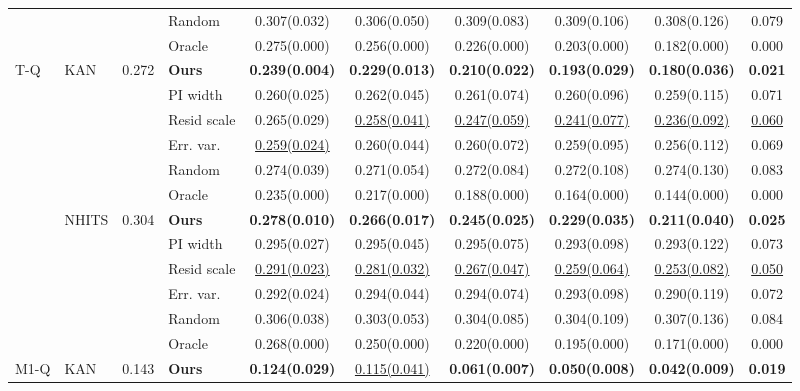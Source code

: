 \begin{table}[t]
\begin{tabular}{@{}llrlcccccc@{}}
\cmidrule(lr){4-10}
 &  &  & Random & 0.307(0.032) & 0.306(0.050) & 0.309(0.083) & 0.309(0.106) & 0.308(0.126) & 0.079 \\
 &  &  & Oracle & 0.275(0.000) & 0.256(0.000) & 0.226(0.000) & 0.203(0.000) & 0.182(0.000) & 0.000 \\
\midrule
T-Q & KAN & 0.272 & \textbf{Ours} & \textbf{0.239(0.004)} & \textbf{0.229(0.013)} & \textbf{0.210(0.022)} & \textbf{0.193(0.029)} & \textbf{0.180(0.036)} & \textbf{0.021} \\
 &  &  & PI width & 0.260(0.025) & 0.262(0.045) & 0.261(0.074) & 0.260(0.096) & 0.259(0.115) & 0.071 \\
 &  &  & Resid scale & 0.265(0.029) & \underline{0.258(0.041)} & \underline{0.247(0.059)} & \underline{0.241(0.077)} & \underline{0.236(0.092)} & \underline{0.060} \\
 &  &  & Err. var. & \underline{0.259(0.024)} & 0.260(0.044) & 0.260(0.072) & 0.259(0.095) & 0.256(0.112) & 0.069 \\
\cmidrule(lr){4-10}
 &  &  & Random & 0.274(0.039) & 0.271(0.054) & 0.272(0.084) & 0.272(0.108) & 0.274(0.130) & 0.083 \\
 &  &  & Oracle & 0.235(0.000) & 0.217(0.000) & 0.188(0.000) & 0.164(0.000) & 0.144(0.000) & 0.000 \\
\cmidrule(lr){2-10}
 & NHITS & 0.304 & \textbf{Ours} & \textbf{0.278(0.010)} & \textbf{0.266(0.017)} & \textbf{0.245(0.025)} & \textbf{0.229(0.035)} & \textbf{0.211(0.040)} & \textbf{0.025} \\
 &  &  & PI width & 0.295(0.027) & 0.295(0.045) & 0.295(0.075) & 0.293(0.098) & 0.293(0.122) & 0.073 \\
 &  &  & Resid scale & \underline{0.291(0.023)} & \underline{0.281(0.032)} & \underline{0.267(0.047)} & \underline{0.259(0.064)} & \underline{0.253(0.082)} & \underline{0.050} \\
 &  &  & Err. var. & 0.292(0.024) & 0.294(0.044) & 0.294(0.074) & 0.293(0.098) & 0.290(0.119) & 0.072 \\
\cmidrule(lr){4-10}
 &  &  & Random & 0.306(0.038) & 0.303(0.053) & 0.304(0.085) & 0.304(0.109) & 0.307(0.136) & 0.084 \\
 &  &  & Oracle & 0.268(0.000) & 0.250(0.000) & 0.220(0.000) & 0.195(0.000) & 0.171(0.000) & 0.000 \\
\midrule
M1-Q & KAN & 0.143 & \textbf{Ours} & \textbf{0.124(0.029)} & \underline{0.115(0.041)} & \textbf{0.061(0.007)} & \textbf{0.050(0.008)} & \textbf{0.042(0.009)} & \textbf{0.019} \\

\end{tabular}
\end{table}
